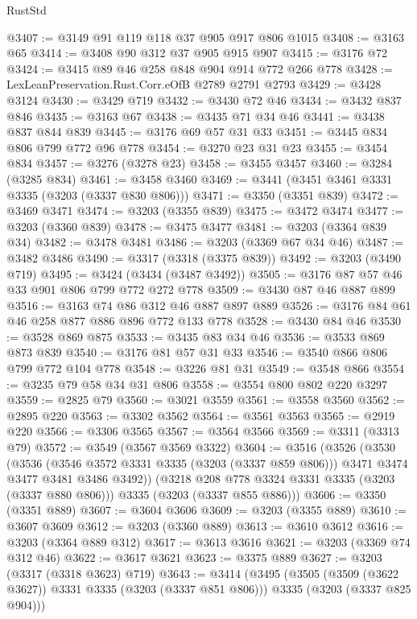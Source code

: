 \begin{lexlean}{RustStd}
\begin{coremodule}
@3407 := @3149 @91 @119 @118 @37 @905 @917 @806 @1015
@3408 := @3163 @65
@3414 := @3408 @90 @312 @37 @905 @915 @907
@3415 := @3176 @72
@3424 := @3415 @89 @46 @258 @848 @904 @914 @772 @266 @778
@3428 := LexLeanPreservation.Rust.Corr.eOfB @2789 @2791 @2793
@3429 := @3428 @3124
@3430 := @3429 @719
@3432 := @3430 @72 @46
@3434 := @3432 @837 @846
@3435 := @3163 @67
@3438 := @3435 @71 @34 @46
@3441 := @3438 @837 @844 @839
@3445 := @3176 @69 @57 @31 @33
@3451 := @3445 @834 @806 @799 @772 @96 @778
@3454 := @3270 @23 @31 @23
@3455 := @3454 @834
@3457 := @3276 (@3278 @23)
@3458 := @3455 @3457
@3460 := @3284 (@3285 @834)
@3461 := @3458 @3460
@3469 := @3441 (@3451 @3461 @3331 @3335 (@3203 (@3337 @830 @806)))
@3471 := @3350 (@3351 @839)
@3472 := @3469 @3471
@3474 := @3203 (@3355 @839)
@3475 := @3472 @3474
@3477 := @3203 (@3360 @839)
@3478 := @3475 @3477
@3481 := @3203 (@3364 @839 @34)
@3482 := @3478 @3481
@3486 := @3203 (@3369 @67 @34 @46)
@3487 := @3482 @3486
@3490 := @3317 (@3318 (@3375 @839))
@3492 := @3203 (@3490 @719)
@3495 := @3424 (@3434 (@3487 @3492))
@3505 := @3176 @87 @57 @46 @33 @901 @806 @799 @772 @272 @778
@3509 := @3430 @87 @46 @887 @899
@3516 := @3163 @74 @86 @312 @46 @887 @897 @889
@3526 := @3176 @84 @61 @46 @258 @877 @886 @896 @772 @133 @778
@3528 := @3430 @84 @46
@3530 := @3528 @869 @875
@3533 := @3435 @83 @34 @46
@3536 := @3533 @869 @873 @839
@3540 := @3176 @81 @57 @31 @33
@3546 := @3540 @866 @806 @799 @772 @104 @778
@3548 := @3226 @81 @31
@3549 := @3548 @866
@3554 := @3235 @79 @58 @34 @31 @806
@3558 := @3554 @800 @802 @220 @3297
@3559 := @2825 @79
@3560 := @3021 @3559
@3561 := @3558 @3560
@3562 := @2895 @220
@3563 := @3302 @3562
@3564 := @3561 @3563
@3565 := @2919 @220
@3566 := @3306 @3565
@3567 := @3564 @3566
@3569 := @3311 (@3313 @79)
@3572 := @3549 (@3567 @3569 @3322)
@3604 := @3516
    (@3526
      (@3530
        (@3536
          (@3546 @3572 @3331 @3335 (@3203 (@3337 @859 @806)))
          @3471
          @3474
          @3477
          @3481
          @3486
          @3492))
      (@3218 @208 @778 @3324 @3331 @3335 (@3203 (@3337 @880 @806)))
      @3335
      (@3203 (@3337 @855 @886)))
@3606 := @3350 (@3351 @889)
@3607 := @3604 @3606
@3609 := @3203 (@3355 @889)
@3610 := @3607 @3609
@3612 := @3203 (@3360 @889)
@3613 := @3610 @3612
@3616 := @3203 (@3364 @889 @312)
@3617 := @3613 @3616
@3621 := @3203 (@3369 @74 @312 @46)
@3622 := @3617 @3621
@3623 := @3375 @889
@3627 := @3203 (@3317 (@3318 @3623) @719)
@3643 := @3414
    (@3495
      (@3505 (@3509 (@3622 @3627)) @3331 @3335 (@3203 (@3337 @851 @806)))
      @3335
      (@3203 (@3337 @825 @904)))

\end{coremodule}
\end{lexlean}

